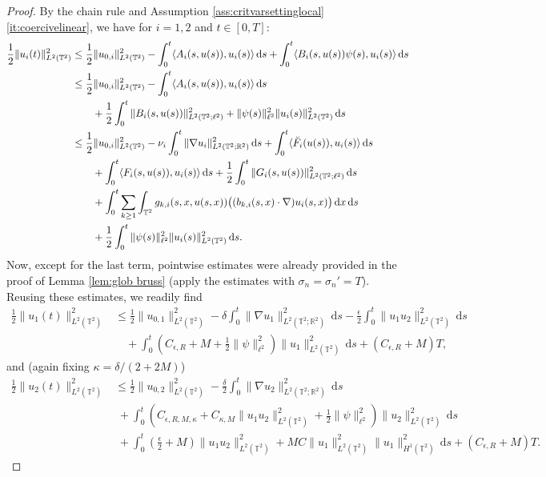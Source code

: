\documentclass{amsart}
\newcommand{\dd}{\,\mathrm{d}}
\newcommand{\<}{\langle}
\newcommand{\?}{\rangle}
\newcommand{\Tor}{\mathbb{T}}
\renewcommand{\Tor}{\mathbb{T}^2}
\theoremstyle{plain}
\theoremstyle{remark}
\theoremstyle{plain}
\numberwithin{equation}{section}
\def\R{{\mathbb R}}
\begin{document}
 \begin{proof} 
 By the chain rule \cite[(A.2)]{TV24} and Assumption \ref{ass:critvarsettinglocal}\ref{it:coercivelinear}, we have  for $i=1,2$ and $t\in[0,T]$: 
\begin{align*}
  \frac12 \|u_i(t)\|_{L^2(\Tor)}^2&\leq \frac12 \|u_{0,i}\|_{L^2(\Tor)}^2- \int_0^t\<A_i(s,u(s)),u_i(s)\?\dd s +  \int_0^t\<B_i(s,u(s))\psi(s),u_i(s)\?\dd s\notag\\
  &\leq \frac12 \|u_{0,i}\|_{L^2(\Tor)}^2- \int_0^t\<A_i(s,u(s)),u_i(s)\?\dd s \\
  &\qquad+  \frac12\int_0^t\|B_i(s,u(s))\|_{L^2(\Tor;\ell^2)}^2+\|\psi(s)\|_{\ell^2}^2\|u_i(s)\|_{L^2(\Tor)}^2\dd s \notag\\ 
   &\leq \frac12 \|u_{0,i}\|_{L^2(\Tor)}^2- \nu_i \int_0^t\|\nabla u_i \|_{L^2(\Tor;\R^2)}^2\dd s + \int_0^t\<\breve{F}_i(u(s)),u_i(s)\?\dd s \notag\\ 
   &\qquad+  \int_0^t\<{F}_i(s,u(s)),u_i(s)\? \dd s +\frac{1}{2}\int_0^t\|G_i(s,u(s))\|_{L^2(\Tor;\ell^2)}^2\dd s\notag\\
   &\qquad+ \int_0^t\sum_{k\geq 1}\int_{\Tor}g_{k,i}(s,x,u(s,x))\big((b_{k,i}(s,x)\cdot\nabla)u_i(s,x)\big)\dd x\dd s\notag\\
   &\qquad +\frac12\int_0^t \|\psi(s)\|_{\ell^2}^2\|u_i(s)\|_{L^2(\Tor)}^2\dd s.  
\end{align*}
Now, except for the last term, pointwise estimates were already provided in the proof of Lemma \ref{lem:glob bruss} (apply the estimates with $\sigma_n=\sigma_n'=T$). Reusing these estimates, we readily find
\begin{align*} 
\tfrac12 \|u_1(t)\|_{L^2(\Tor)}^2 &\leq \tfrac12 \|u_{0,1}\|_{L^2(\Tor)}^2 -\delta\int_0^t\|\nabla u_1\|_{L^2(\Tor;\R^2)}^2\dd s-\frac{\epsilon}{2}\int_0^t\| u_1 u_2\|_{L^2(\Tor)}^2 \dd s\\
   &\quad+ \int_0^t (C_{\epsilon,R}+M+\tfrac12\|\psi\|_{\ell^2}^2) \|u_1\|_{L^2(\Tor)}^2 \dd s+(C_{\epsilon,R}+M)T, 
\end{align*}
and (again fixing $\kappa=\delta/(2+2M)$) 
 \begin{align*}
  \tfrac12 \|u_2(t)\|_{L^2(\Tor)}^2  &\leq \tfrac12 \|u_{0,2}\|_{L^2(\Tor)}^2 -\tfrac{\delta}{2}\int_0^t\|\nabla u_2\|_{L^2(\Tor;\R^2)}^2\dd s \\
   &\;+ \int_0^t (C_{\epsilon,{R},M,\kappa}+C_{\kappa,M}\|u_1u_2\|_{L^2(\Tor)}^2 +\tfrac12\|\psi\|_{\ell^2}^2) \|u_2\|_{L^2(\Tor )}^2 \dd s\\
   &\;+ \int_0^t (\tfrac{\epsilon}{2}+M)\|u_1u_2\|_{L^2(\Tor)}^2+MC\|u_1\|_{L^2(\Tor)}^2\| u_1\|_{H^1(\Tor )}^2\dd s+ (C_{\epsilon,R}+M)T.

\end{align*}
\end{proof}
\end{document}
